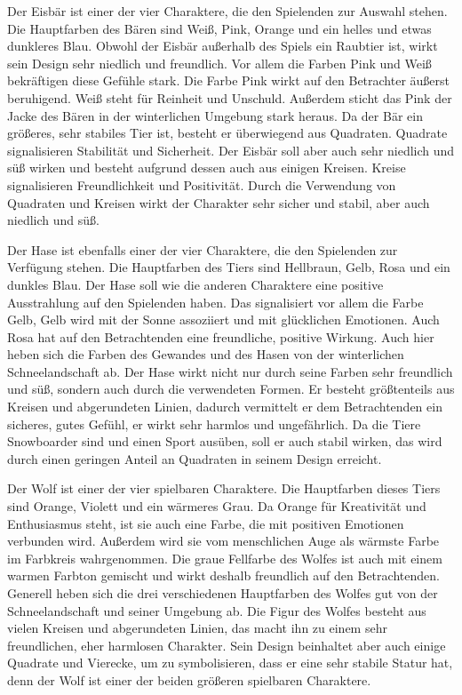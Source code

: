 Der Eisbär ist einer der vier Charaktere, die den Spielenden zur Auswahl stehen. Die Hauptfarben des Bären sind Weiß, Pink, Orange und ein helles und etwas dunkleres Blau. Obwohl der Eisbär außerhalb des Spiels ein Raubtier ist, wirkt sein Design sehr niedlich und freundlich. Vor allem die Farben Pink und Weiß bekräftigen diese Gefühle stark. Die Farbe Pink wirkt auf den Betrachter äußerst beruhigend. Weiß steht für Reinheit und Unschuld. Außerdem sticht das Pink der Jacke des Bären in der winterlichen Umgebung stark heraus.
Da der Bär ein größeres, sehr stabiles Tier ist, besteht er überwiegend aus Quadraten. Quadrate signalisieren Stabilität und Sicherheit. Der Eisbär soll aber auch sehr niedlich und süß wirken und besteht aufgrund dessen auch aus einigen Kreisen. Kreise signalisieren Freundlichkeit und Positivität. Durch die Verwendung von Quadraten und Kreisen wirkt der Charakter sehr sicher und stabil, aber auch niedlich und süß.


Der Hase ist ebenfalls einer der vier Charaktere, die den Spielenden zur Verfügung stehen. Die Hauptfarben des Tiers sind Hellbraun, Gelb, Rosa und ein dunkles Blau. Der Hase soll wie die anderen Charaktere eine positive Ausstrahlung auf den Spielenden haben. Das signalisiert vor allem die Farbe Gelb, Gelb wird mit der Sonne assoziiert und mit glücklichen Emotionen. Auch Rosa hat auf den Betrachtenden eine freundliche, positive Wirkung. Auch hier heben sich die Farben des Gewandes und des Hasen von der winterlichen Schneelandschaft ab. 
Der Hase wirkt nicht nur durch seine Farben sehr freundlich und süß, sondern auch durch die verwendeten Formen. Er besteht größtenteils aus Kreisen und abgerundeten Linien, dadurch vermittelt er dem Betrachtenden ein sicheres, gutes Gefühl, er wirkt sehr harmlos und ungefährlich. Da die Tiere Snowboarder sind und einen Sport ausüben, soll er auch stabil wirken, das wird durch einen geringen Anteil an Quadraten in seinem Design erreicht.


Der Wolf ist einer der vier spielbaren Charaktere. Die Hauptfarben dieses Tiers sind Orange, Violett und ein wärmeres Grau. Da Orange für Kreativität und Enthusiasmus steht, ist sie auch eine Farbe, die mit positiven Emotionen verbunden wird. Außerdem wird sie vom menschlichen Auge als wärmste Farbe im Farbkreis wahrgenommen. Die graue Fellfarbe des Wolfes ist auch mit einem warmen Farbton gemischt und wirkt deshalb freundlich auf den Betrachtenden. Generell heben sich die drei verschiedenen Hauptfarben des Wolfes gut von der Schneelandschaft und seiner Umgebung ab.
Die Figur des Wolfes besteht aus vielen Kreisen und abgerundeten Linien, das macht ihn zu einem sehr freundlichen, eher harmlosen Charakter. Sein Design beinhaltet aber auch einige Quadrate und Vierecke, um zu symbolisieren, dass er eine sehr stabile Statur hat, denn der Wolf ist einer der beiden größeren spielbaren Charaktere.

